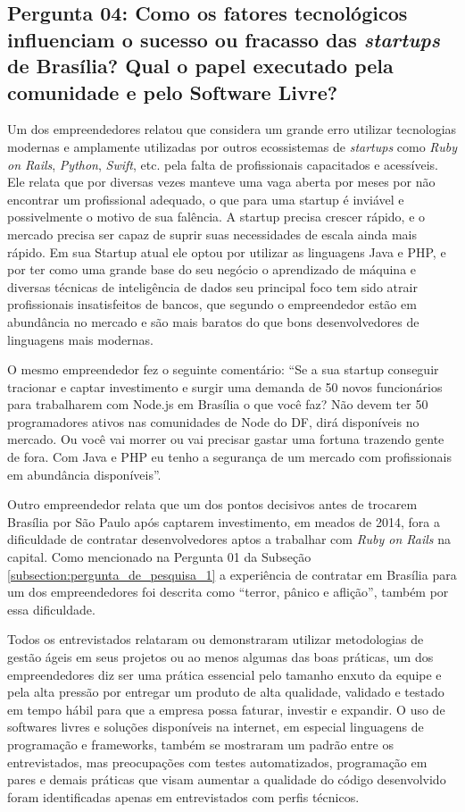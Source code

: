 \subsection*{Pergunta 04: Como os fatores tecnológicos influenciam o sucesso ou fracasso das \textit{startups} de Brasília? Qual o papel executado pela comunidade e pelo Software Livre?}
\label{subsection:pergunta_de_pesquisa_4}

Um dos empreendedores relatou que considera um grande erro utilizar tecnologias modernas e amplamente utilizadas por outros ecossistemas de \textit{startups} como \textit{Ruby on Rails}, \textit{Python}, \textit{Swift}, etc. pela falta de profissionais capacitados e acessíveis. Ele relata que por diversas vezes manteve uma vaga aberta por meses por não encontrar um profissional adequado, o que para uma startup é inviável e possivelmente o motivo de sua falência. A startup precisa crescer rápido, e o mercado precisa ser capaz de suprir suas necessidades de escala ainda mais rápido. Em sua Startup atual ele optou por utilizar as linguagens Java e PHP, e por ter como uma grande base do seu negócio o aprendizado de máquina e diversas técnicas de inteligência de dados seu principal foco tem sido atrair profissionais insatisfeitos de bancos, que segundo o empreendedor estão em abundância no mercado e são mais baratos do que bons desenvolvedores de linguagens mais modernas. 

O mesmo empreendedor fez o seguinte comentário: ``Se a sua startup conseguir tracionar e captar investimento e surgir uma demanda de 50 novos funcionários para trabalharem com Node.js em Brasília o que você faz? Não devem ter 50 programadores ativos nas comunidades de Node do DF, dirá disponíveis no mercado. Ou você vai morrer ou vai precisar gastar uma fortuna trazendo gente de fora. Com Java e PHP eu tenho a segurança de um mercado com profissionais em abundância disponíveis''.

Outro empreendedor relata que um dos pontos decisivos antes de trocarem Brasília por São Paulo após captarem investimento, em meados de 2014, fora a dificuldade de contratar desenvolvedores aptos a trabalhar com \textit{Ruby on Rails} na capital. Como mencionado na Pergunta 01 da Subseção \ref{subsection:pergunta_de_pesquisa_1} a experiência de contratar em Brasília para um dos empreendedores foi descrita como ``terror, pânico e aflição'', também por essa dificuldade.

Todos os entrevistados relataram ou demonstraram utilizar metodologias de gestão ágeis em seus projetos ou ao menos algumas das boas práticas, um dos empreendedores diz ser uma prática essencial pelo tamanho enxuto da equipe e pela alta pressão por entregar um produto de alta qualidade, validado e testado em tempo hábil para que a empresa possa faturar, investir e expandir. O uso de softwares livres e soluções disponíveis na internet, em especial linguagens de programação e frameworks, também se mostraram um padrão entre os entrevistados, mas preocupações com testes automatizados, programação em pares e demais práticas que visam aumentar a qualidade do código desenvolvido foram identificadas apenas em entrevistados com perfis técnicos.


